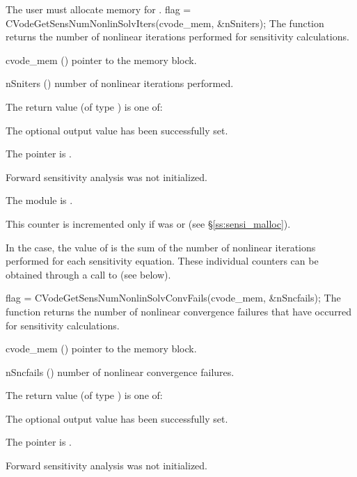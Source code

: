 {
  The user must allocate memory for .
}
{
  flag = CVodeGetSensNumNonlinSolvIters(cvode\_mem, \&nSniters);
}
{
  The function  returns the
  number of nonlinear iterations performed for 
  sensitivity calculations.
}
{
  \begin{args}
  \item[cvode\_mem] ()
    pointer to the {\cvodes} memory block.
  \item[nSniters] ()
    number of nonlinear iterations performed.
  \end{args}
}
{
  The return value  (of type ) is one of:
  \begin{args}
  \item[\Id{CV\_SUCCESS}] 
    The optional output value has been successfully set.
  \item[\Id{CV\_MEM\_NULL}]
    The  pointer is .
  \item[\Id{CV\_NO\_SENS}]
    Forward sensitivity analysis was not initialized.
  \item[\Id{CV\_MEM\_FAIL}]
    The {\sunnonlinsol} module is .
  \end{args}
}
{
  This counter is incremented only if  was  or 
   (see \S\ref{ss:sensi_malloc}).
  
  In the  case, the value of  is the sum of 
  the number of nonlinear iterations performed for each sensitivity equation.
  These individual counters can be obtained through a call to
   (see below).
}
{
  flag = CVodeGetSensNumNonlinSolvConvFails(cvode\_mem, \&nSncfails);
}
{
  The function  returns the
  number of nonlinear convergence failures that have occurred for
  sensitivity calculations.
}
{
  \begin{args}
  \item[cvode\_mem] ()
    pointer to the {\cvodes} memory block.
  \item[nSncfails] ()
    number of nonlinear convergence failures.
  \end{args}
}
{
  The return value  (of type ) is one of:
  \begin{args}
  \item[\Id{CV\_SUCCESS}] 
    The optional output value has been successfully set.
  \item[\Id{CV\_MEM\_NULL}]
    The  pointer is .
  \item[\Id{CV\_NO\_SENS}]
    Forward sensitivity analysis was not initialized.
  \end{args}
}

